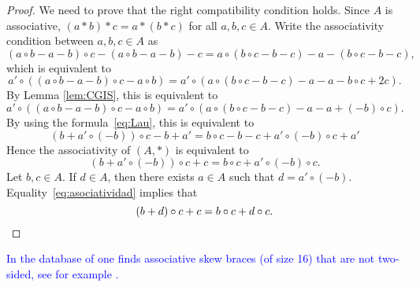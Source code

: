 \begin{proof}
    We need to prove that the right compatibility condition holds. 
    Since $A$ is associative, $(a*b)*c=a*(b*c)$ for all $a,b,c\in A$. Write the associativity condition between $a,b,c\in A$ as
 	\[
 	(a\circ b-a-b)\circ c-(a\circ b-a-b)-c
 	=a\circ (b\circ c-b-c)-a-(b\circ c-b-c),
 	\]
 	which is equivalent to 
 	\[
 	a'\circ ( (a\circ b-a-b)\circ c-a\circ b)
 	=a'\circ ( a\circ (b\circ c-b-c)-a-a-b\circ c+2c).
 	\]
 	By Lemma \ref{lem:CGIS}, this is equivalent to
 	\[ a'\circ ( (a\circ b-a-b)\circ c-a\circ b)
 	=a'\circ ( a\circ (b\circ c-b-c)-a-a+(-b)\circ c).
 	\]
    By using the formula~\eqref{eq:Lau}, this is equivalent to  
 	\[
 	(b+a'\circ(-b))\circ c-b+a'=b\circ c-b-c+a'\circ (-b)\circ c+a'
 	\]
 	Hence the associativity of $(A,*)$ is equivalent to 
 	\begin{equation}
 	    \label{eq:asociatividad}
 		(b+a'\circ (-b))\circ c+c=b\circ c+a'\circ(-b)\circ c.
 	\end{equation}
 	Let $b,c\in A$. If $d\in A$, then there exists $a\in A$ such that $d=a'\circ (-b)$. Equality~\eqref{eq:asociatividad} 
    implies that 
 	\[
 	(b+d)\circ c+c=b\circ c+d\circ c.\qedhere
 	\]
\end{proof}


\textcolor{blue}{In the database of \cite{MR3647970} one finds associative skew braces (of size 16) that are not two-sided, see for example \cite{MR4223285}.}



	
